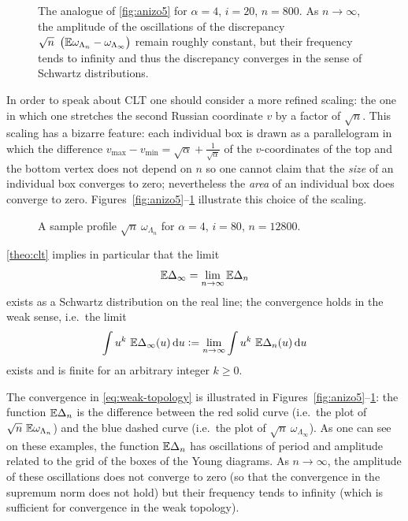 \documentclass[12pt,usenames,dvipsnames,svgnames,table]{amsart}
\begin{document}
\begin{figure}
	\centering
	
	
	\caption{
		The analogue of \cref{fig:anizo5}
		for $\alpha=4$, $i=20$, $n=800$.
		As $n\to\infty$, the amplitude of the oscillations of the discrepancy 
		$\sqrt{n}\ \left( \mathbb{E} \omega_{\Lambda_n}- \omega_{\Lambda_\infty} \right)$
		remain roughly constant, but their frequency tends to infinity and thus
		the discrepancy converges in the sense of Schwartz distributions.}
	\label{fig:anizo20}
	
\end{figure}

\smallskip

In order to speak about CLT one should consider a more refined scaling:
the one in which one stretches the second Russian coordinate $v$ by a factor of $\sqrt{n}$.
This scaling has a bizarre feature: each individual box is drawn as a parallelogram in 
which the difference 
$v_{\operatorname{max}}-v_{\operatorname{min}}=\sqrt{\alpha}+\frac{1}{\sqrt{\alpha}}$
of the $v$-coordinates of the top and the bottom vertex does not depend on $n$
so one cannot claim that the \emph{size} of an individual box converges to zero;
nevertheless the \emph{area} of an individual box does converge to zero.
Figures~\ref{fig:anizo5}--\ref{fig:anizo20} illustrate this choice of the scaling.

\smallskip

\begin{figure}
	\centering
	
	\caption{A sample profile $\sqrt{n}\ \omega_{\Lambda_n}$ for
		$\alpha=4$, $i=80$, $n=12800$.}
	\label{eq:sample-path}
\end{figure}

\cref{theo:clt} implies in particular that
the limit
\begin{equation}
\label{eq:weak-topology}
\mathbb{E} \Delta_\infty= \lim_{n\to\infty} \mathbb{E} \Delta_n    
\end{equation}
exists as a Schwartz distribution on the real line;
the convergence holds in the weak sense, i.e.~the limit
\[ 
\int u^k\ \E\Delta_\infty(u)  \dif u :=
\lim_{n\to\infty} \int u^k\ \E \Delta_n(u) \dif u 
\]
exists and is finite for an arbitrary integer $k\geq 0$.

The convergence in \eqref{eq:weak-topology} is illustrated in 
Figures~\ref{fig:anizo5}--\ref{fig:anizo20}:
the function $\mathbb{E}\Delta_n$ is the difference between the red solid curve
(i.e.~the plot of $\sqrt{n} \ \mathbb{E} \omega_{\Lambda_n}$)
and the blue dashed curve (i.e.~the plot of $\sqrt{n}\ \omega_{\Lambda_\infty}$). 
As one can see on these examples, the function
$\mathbb{E}\Delta_n$ has oscillations of period and amplitude related to the grid of the boxes
of the Young diagrams. As $n\to\infty$, the amplitude of these oscillations
does not converge to zero (so that the convergence in the supremum norm 
does not hold)
but their frequency tends to infinity (which 
is sufficient for convergence in the weak topology). 
\end{document}
